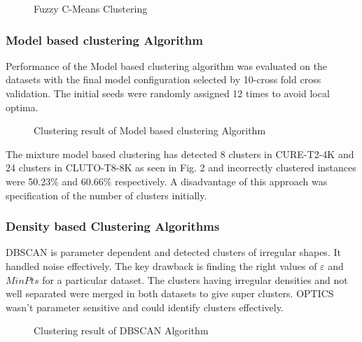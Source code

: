 \begin{figure}[H]
\centering
\setlength{\lineskip}{\medskipamount}
\hfill
{}
\caption{Fuzzy C-Means Clustering} \label{fig:1}
\end{figure}



\subsubsection{Model based clustering Algorithm}
Performance of the Model based clustering algorithm was evaluated on the datasets with the final model configuration selected by 10-cross fold cross validation. The initial seeds were randomly assigned 12 times to avoid local optima.

\begin{figure}[H]
\centering
\setlength{\lineskip}{\medskipamount}
\hfill
{}
\caption{Clustering result of Model based clustering Algorithm} \label{fig:1}
\end{figure}




The mixture model based clustering has detected 8 clusters in CURE-T2-4K and 24 clusters in CLUTO-T8-8K as seen in Fig. 2 and incorrectly clustered instances were 50.23\% and 60.66\% respectively. A disadvantage of this approach was specification of the number of clusters initially.

\subsubsection{Density based Clustering Algorithms}

DBSCAN is parameter dependent and detected clusters of irregular shapes. It handled noise effectively. The key drawback is finding the right values of $\varepsilon$ and $MinPts$ for a particular dataset. The clusters having irregular densities and not well separated were merged in both datasets to give super clusters. OPTICS wasn't parameter sensitive and could identify clusters effectively.  

\begin{figure}[H]
\centering
\setlength{\lineskip}{\medskipamount}
\hfill
{}
\caption{Clustering result of DBSCAN Algorithm} \label{fig:1}
\end{figure}



